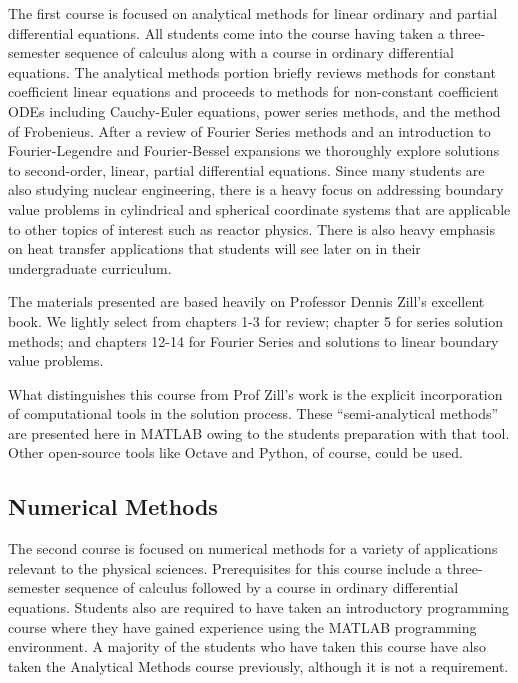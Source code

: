 \documentclass{tufte-book}
\theoremstyle{break}
\begin{document}
The first course is focused on analytical methods for linear ordinary and partial differential equations.  All students come into the course having taken a three-semester sequence of calculus along with a course in ordinary differential equations.  The analytical methods portion briefly reviews methods for constant coefficient linear equations and proceeds to methods for non-constant coefficient ODEs including Cauchy-Euler equations, power series methods, and the method of Frobenieus.  After a review of Fourier Series methods and an introduction to Fourier-Legendre and Fourier-Bessel expansions we thoroughly explore solutions to second-order, linear, partial differential equations.  Since many students are also studying nuclear engineering, there is a heavy focus on addressing boundary value problems in cylindrical and spherical coordinate systems that are applicable to other topics of interest such as reactor physics.  There is also heavy emphasis on heat transfer applications that students will see later on in their undergraduate curriculum.

The materials presented are based heavily on Professor Dennis Zill's excellent book.\cite[-3cm]{zill2020advanced} We lightly select from chapters 1-3 for review; chapter 5 for series solution methods; and chapters 12-14 for Fourier Series and solutions to linear boundary value problems.  

What distinguishes this course from Prof Zill's work is the explicit incorporation of computational tools in the solution process.  These ``semi-analytical methods'' are presented here in MATLAB\cite[-3.75cm]{matlab} owing to the students preparation with that tool.  Other open-source tools like Octave\cite[-3.5cm]{octave} and Python,\cite[-1cm]{10.5555/1593511} of course, could be used. 

\subsection*{Numerical Methods}
The second course is focused on numerical methods for a variety of applications relevant to the physical sciences.  Prerequisites for this course include a three-semester sequence of calculus followed by a course in ordinary differential equations. Students also are required to have taken an introductory programming course where they have gained experience using the MATLAB programming environment.  A majority of the students who have taken this course have also taken the Analytical Methods course previously, although it is not a requirement.  
\end{document}

